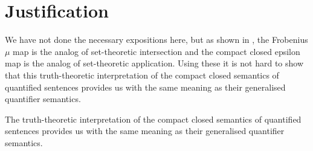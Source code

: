\section{Justification}
\label{just}


We have not done the necessary expositions here, but as shown in \cite{CoeckePaquettePavlovic09,CoeckePaq},  the Frobenius $ \mu$ map is the analog of  set-theoretic intersection and the compact closed  epsilon map is the analog of  set-theoretic application. Using these it is not hard to show that  this truth-theoretic interpretation of the compact closed semantics of quantified sentences provides us with the same meaning as their generalised quantifier semantics.

\begin{proposition}
The truth-theoretic interpretation of the compact closed semantics of quantified sentences provides us with the same meaning as their generalised quantifier semantics.
\end{proposition}


